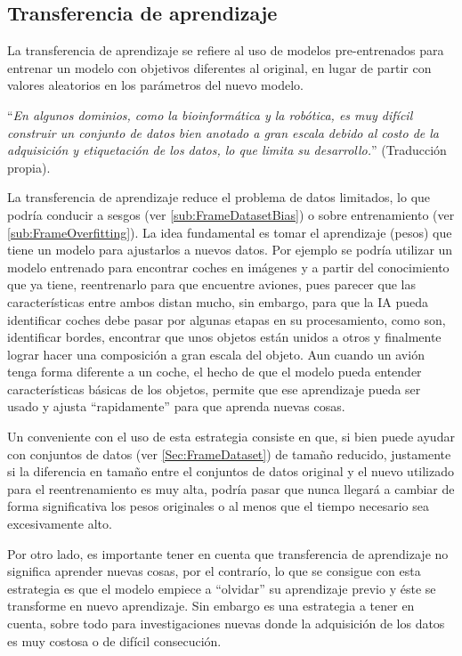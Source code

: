     \subsection{Transferencia de aprendizaje}
        La transferencia de aprendizaje se refiere al uso de modelos pre-entrenados para entrenar un modelo con objetivos diferentes al original, en lugar de partir con valores aleatorios en los parámetros del nuevo modelo.
        
        ``\textit{En algunos dominios, como la bioinformática y la robótica, es muy difícil construir un conjunto de datos bien anotado a gran escala debido al costo de la adquisición y etiquetación de los datos, lo que limita su desarrollo.}'' \cite{Tan2018TransferLearning} (Traducción propia).
        
        La transferencia de aprendizaje reduce el problema de datos limitados, lo que podría conducir a sesgos (ver \ref{sub:FrameDatasetBias}) o sobre entrenamiento (ver \ref{sub:FrameOverfitting}). La idea fundamental es tomar el aprendizaje (pesos) que tiene un modelo para ajustarlos a nuevos datos. Por ejemplo se podría utilizar un modelo entrenado para encontrar coches en imágenes y a partir del conocimiento que ya tiene, reentrenarlo para que encuentre aviones, pues parecer que las características entre ambos distan mucho, sin embargo, para que la IA pueda identificar coches debe pasar por algunas etapas en su procesamiento, como son, identificar bordes, encontrar que unos objetos están unidos a otros y finalmente lograr hacer una composición a gran escala del objeto. Aun cuando un avión tenga forma diferente a un coche, el hecho de que el modelo pueda entender características básicas de los objetos, permite que ese aprendizaje pueda ser usado y ajusta ``rapidamente'' para que aprenda nuevas cosas.
    
        Un conveniente con el uso de esta estrategia consiste en que, si bien puede ayudar con conjuntos de datos (ver \ref{Sec:FrameDataset}) de tamaño reducido, justamente si la diferencia en tamaño entre el conjuntos de datos original y el nuevo utilizado para el reentrenamiento es muy alta, podría pasar que nunca llegará a cambiar de forma significativa los pesos originales o al menos que el tiempo necesario sea excesivamente alto.
        
        Por otro lado, es importante tener en cuenta que transferencia de aprendizaje no significa aprender nuevas cosas, por el contrarío, lo que se consigue con esta estrategia es que el modelo empiece a ``olvidar'' su aprendizaje previo y éste se transforme en nuevo aprendizaje. Sin embargo es una estrategia a tener en cuenta, sobre todo para investigaciones nuevas donde la adquisición de los datos es muy costosa o de difícil consecución.
    
